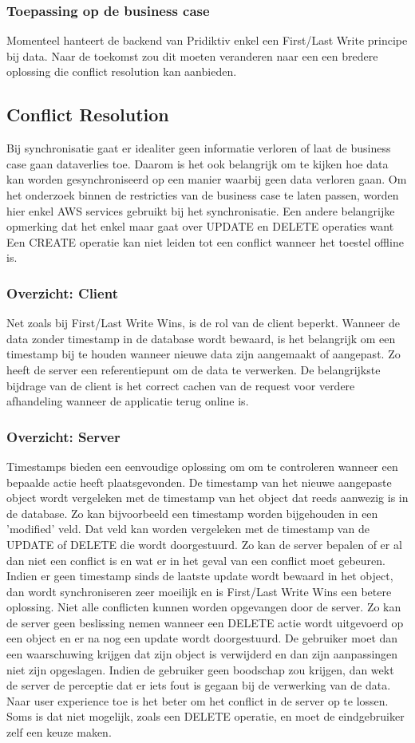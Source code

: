 \subsubsection{Toepassing op de business case}
Momenteel hanteert de backend van Pridiktiv enkel een First/Last Write principe bij data. Naar de toekomst zou dit moeten veranderen naar een een bredere oplossing die conflict resolution kan aanbieden.

\subsection{Conflict Resolution}
Bij synchronisatie gaat er idealiter geen informatie verloren of laat de business case gaan dataverlies toe. Daarom is het ook belangrijk om te kijken hoe data kan worden gesynchroniseerd op een manier waarbij geen data verloren gaan. Om het onderzoek binnen de restricties van de business case te laten passen, worden hier enkel AWS services gebruikt bij het synchronisatie. Een andere belangrijke opmerking dat het enkel maar gaat over UPDATE en DELETE operaties want Een CREATE operatie kan niet leiden tot een conflict wanneer het toestel offline is.
\subsubsection{Overzicht: Client}
Net zoals bij First/Last Write Wins, is de rol van de client beperkt. Wanneer de data zonder timestamp in de database wordt bewaard, is het belangrijk om een timestamp bij te houden wanneer nieuwe data zijn aangemaakt of aangepast. Zo heeft de server een referentiepunt om de data te verwerken. De belangrijkste bijdrage van de client is het correct cachen van de request voor verdere afhandeling wanneer de applicatie terug online is.
\subsubsection{Overzicht: Server}
Timestamps bieden een eenvoudige oplossing om om te  controleren wanneer een bepaalde actie heeft plaatsgevonden. De timestamp van het nieuwe aangepaste object wordt vergeleken met de timestamp van het object dat reeds aanwezig is in de database. Zo kan bijvoorbeeld een timestamp worden bijgehouden in een 'modified' veld. Dat veld kan worden vergeleken met de timestamp van de UPDATE of DELETE die wordt doorgestuurd. Zo kan de server bepalen of er al dan niet een conflict is en wat er in het geval van een conflict moet gebeuren. Indien er geen timestamp sinds de laatste update wordt bewaard in het object, dan wordt synchroniseren zeer moeilijk en is First/Last Write Wins een betere oplossing. Niet alle conflicten kunnen worden opgevangen door de server. Zo kan de server geen beslissing nemen wanneer een DELETE actie wordt uitgevoerd op een object en er na nog een update wordt doorgestuurd. De gebruiker moet dan een waarschuwing krijgen dat zijn object is verwijderd en dan zijn aanpassingen niet zijn opgeslagen. Indien de gebruiker geen boodschap zou krijgen, dan wekt de server de perceptie dat er iets fout is gegaan bij de verwerking van de data. Naar user experience toe is het beter om het conflict in de server op te lossen. Soms is dat niet mogelijk, zoals een DELETE operatie, en moet de eindgebruiker zelf een keuze maken.
